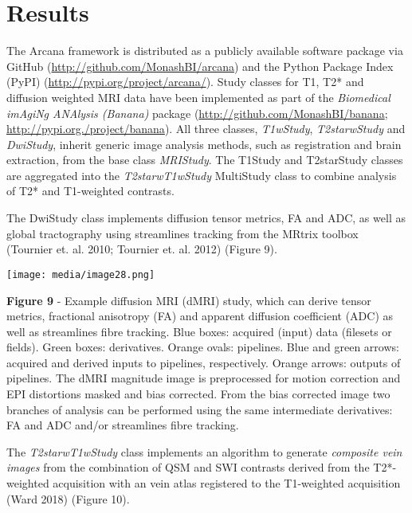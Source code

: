 \hypertarget{results}{%
\section{Results}\label{results}}

The Arcana framework is distributed as a publicly available software
package via GitHub
(\href{http://github.com/MonashBI/arcana}{{http://github.com/MonashBI/arcana}})
and the Python Package Index (PyPI)
(\href{https://pypi.org/project/arcana/}{{http://pypi.org/project/arcana/}}).
Study classes for T1, T2* and diffusion weighted MRI data have been
implemented as part of the \emph{Biomedical imAgiNg ANAlysis (Banana)}
package
(\href{https://github.com/MonashBI/banana}{{http://github.com/MonashBI/banana}};
\href{http://pypi.org./project/banana}{{http://pypi.org./project/banana}}).
All three classes, \emph{T1wStudy}, \emph{T2starwStudy} and
\emph{DwiStudy}, inherit generic image analysis methods, such as
registration and brain extraction, from the base class \emph{MRIStudy}.
The T1Study and T2starStudy classes are aggregated into the
\emph{T2starwT1wStudy} MultiStudy class to combine analysis of T2* and
T1-weighted contrasts.

The DwiStudy class implements diffusion tensor metrics, FA and ADC, as
well as global tractography using streamlines tracking from the MRtrix
toolbox (Tournier et. al. 2010; Tournier et. al. 2012) (Figure 9).

\texttt{[image: media/image28.png]}

\textbf{Figure 9} - Example diffusion MRI (dMRI) study, which can derive
tensor metrics, fractional anisotropy (FA) and apparent diffusion
coefficient (ADC) as well as streamlines fibre tracking. Blue boxes:
acquired (input) data (filesets or fields). Green boxes: derivatives.
Orange ovals: pipelines. Blue and green arrows: acquired and derived
inputs to pipelines, respectively. Orange arrows: outputs of pipelines.
The dMRI magnitude image is preprocessed for motion correction and EPI
distortions masked and bias corrected. From the bias corrected image two
branches of analysis can be performed using the same intermediate
derivatives: FA and ADC and/or streamlines fibre tracking.

The \emph{T2starwT1wStudy} class implements an algorithm to generate
\emph{composite vein images} from the combination of QSM and SWI
contrasts derived from the T2*-weighted acquisition with an vein atlas
registered to the T1-weighted acquisition (Ward 2018) (Figure 10).

